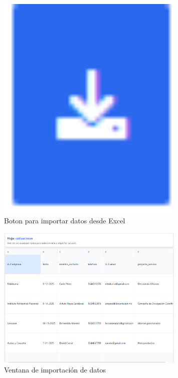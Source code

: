 \documentclass{Pretexto/bluereport}
\begin{document}
\begin{figure}[H]
    \centering
    \includegraphics[width=0.8\textwidth]{img/boton_importacion.png}
    \caption{Boton para importar datos desde Excel}
    \label{fig:importar_datos}
\end{figure}

\begin{figure}[H]
    \centering
    \includegraphics[width=0.8\textwidth]{img/ventana_importacion.png}
    \caption{Ventana de importación de datos}
    \label{fig:ventana_importacion}
\end{figure}
\end{document}
